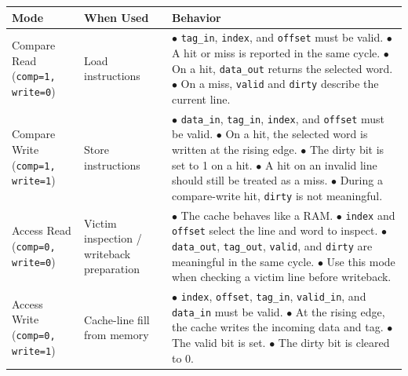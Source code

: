 \documentclass[12pt]{article}
\begin{document}
\begin{center}
\begingroup
\small
\setlength{\tabcolsep}{5pt}
\renewcommand{\arraystretch}{1.03}
\begin{tabular}{|p{3.2cm}|p{3.2cm}|p{7.2cm}|}
\hline
\textbf{Mode} & \textbf{When Used} & \textbf{Behavior} \\
\hline
Compare Read \newline (\texttt{comp=1, write=0}) &
Load instructions &
\parbox[t]{\linewidth}{\raggedright
$\bullet$ \texttt{tag\_in}, \texttt{index}, and \texttt{offset} must be valid.\\
$\bullet$ A hit or miss is reported in the same cycle.\\
$\bullet$ On a hit, \texttt{data\_out} returns the selected word.\\
$\bullet$ On a miss, \texttt{valid} and \texttt{dirty} describe the current line.\\[0.15em]} \\
\hline
Compare Write \newline (\texttt{comp=1, write=1}) &
Store instructions &
\parbox[t]{\linewidth}{\raggedright
$\bullet$ \texttt{data\_in}, \texttt{tag\_in}, \texttt{index}, and \texttt{offset} must be valid.\\
$\bullet$ On a hit, the selected word is written at the rising edge.\\
$\bullet$ The dirty bit is set to 1 on a hit.\\
$\bullet$ A hit on an invalid line should still be treated as a miss.\\
$\bullet$ During a compare-write hit, \texttt{dirty} is not meaningful.\\[0.15em]} \\
\hline
Access Read \newline (\texttt{comp=0, write=0}) &
Victim inspection / writeback preparation &
\parbox[t]{\linewidth}{\raggedright
$\bullet$ The cache behaves like a RAM.\\
$\bullet$ \texttt{index} and \texttt{offset} select the line and word to inspect.\\
$\bullet$ \texttt{data\_out}, \texttt{tag\_out}, \texttt{valid}, and \texttt{dirty} are meaningful in the same cycle.\\
$\bullet$ Use this mode when checking a victim line before writeback.\\[0.15em]} \\
\hline
Access Write \newline (\texttt{comp=0, write=1}) &
Cache-line fill from memory &
\parbox[t]{\linewidth}{\raggedright
$\bullet$ \texttt{index}, \texttt{offset}, \texttt{tag\_in}, \texttt{valid\_in}, and \texttt{data\_in} must be valid.\\
$\bullet$ At the rising edge, the cache writes the incoming data and tag.\\
$\bullet$ The valid bit is set.\\
$\bullet$ The dirty bit is cleared to 0.\\[0.15em]} \\
\hline
\end{tabular}
\endgroup
\end{center}
\end{document}
